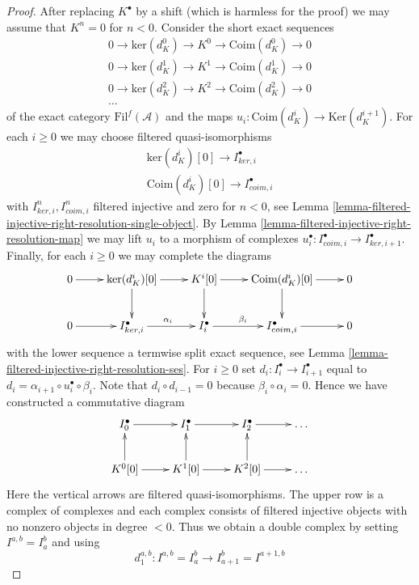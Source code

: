\begin{proof}
After replacing $K^\bullet$ by a shift (which is harmless for the proof)
we may assume that $K^n = 0$ for $n < 0$. Consider the
short exact sequences
$$
\begin{matrix}
0 \to \text{ker}(d_K^0) \to K^0 \to \text{Coim}(d_K^0) \to 0 \\
0 \to \text{ker}(d_K^1) \to K^1 \to \text{Coim}(d_K^1) \to 0 \\
0 \to \text{ker}(d_K^2) \to K^2 \to \text{Coim}(d_K^2) \to 0 \\
\ldots
\end{matrix}
$$
of the exact category $\text{Fil}^f(\mathcal{A})$
and the maps $u_i : \text{Coim}(d_K^i) \to \text{Ker}(d_K^{i + 1})$.
For each $i \geq 0$ we may choose filtered quasi-isomorphisms
$$
\begin{matrix}
\text{ker}(d_K^i)[0] \to I_{ker, i}^\bullet \\
\text{Coim}(d_K^i)[0] \to I_{coim, i}^\bullet
\end{matrix}
$$
with $I_{ker, i}^n, I_{coim, i}^n$ filtered injective and zero for $n < 0$, see
Lemma \ref{lemma-filtered-injective-right-resolution-single-object}.
By
Lemma \ref{lemma-filtered-injective-right-resolution-map}
we may lift $u_i$ to a morphism of complexes
$u_i^\bullet : I_{coim, i}^\bullet \to I_{ker, i + 1}^\bullet$.
Finally, for each $i \geq 0$ we may complete the diagrams
$$
\xymatrix{
0 \ar[r] &
\text{ker}(d_K^i)[0] \ar[r] \ar[d] &
K^i[0] \ar[r] \ar[d] &
\text{Coim}(d_K^i)[0] \ar[r] \ar[d] &
0 \\
0 \ar[r] &
I_{ker, i}^\bullet \ar[r]^{\alpha_i} &
I_i^\bullet \ar[r]^{\beta_i} &
I_{coim, i}^\bullet \ar[r] &
0
}
$$
with the lower sequence a termwise split exact sequence, see
Lemma \ref{lemma-filtered-injective-right-resolution-ses}.
For $i \geq 0$ set $d_i : I_i^\bullet \to I_{i + 1}^\bullet$
equal to $d_i =  \alpha_{i + 1} \circ u_i^\bullet \circ \beta_i$.
Note that $d_i \circ d_{i - 1} = 0$ because
$\beta_i \circ \alpha_i = 0$. Hence we have constructed
a commutative diagram
$$
\xymatrix{
I_0^\bullet \ar[r] &
I_1^\bullet \ar[r] &
I_2^\bullet \ar[r] & \ldots \\
K^0[0] \ar[r] \ar[u] &
K^1[0] \ar[r] \ar[u] &
K^2[0] \ar[r] \ar[u] &
\ldots
}
$$
Here the vertical arrows are filtered quasi-isomorphisms.
The upper row is a complex of complexes and each complex consists of
filtered injective objects with no nonzero objects in degree $< 0$.
Thus we obtain a double complex by setting $I^{a, b} = I_a^b$ and using
$$
d_1^{a, b} : I^{a, b} = I_a^b \to I_{a + 1}^b = I^{a + 1, b}
$$
\end{proof}
